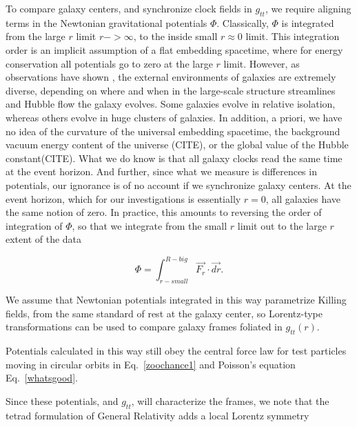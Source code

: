 \documentclass[reprint,%
 amsmath,amssymb,
 aps,
]{revtex4-1}
\begin{document}
 




 
   
  To compare galaxy centers, and  
 synchronize   clock fields   in $g_{tt}$, we   require aligning terms in  the Newtonian  gravitational potentials  $\Phi $. 
 Classically, $\Phi$ is integrated from the large $r$ limit   $r->\infty$,  to the inside small $r\approx 0$ limit. 
This integration order is an implicit assumption of a flat embedding spacetime, where for   energy conservation all potentials go to zero at the large $r$ limit. 
However,  as observations have shown \cite{Pomarede:2020pme,Hoffman:2017ako}, 
the external environments of galaxies are   extremely   diverse,   depending on where and when  in the large-scale structure streamlines and Hubble flow the galaxy evolves. Some galaxies evolve in relative isolation, whereas others evolve in   huge clusters of galaxies. In addition, a priori,  we have no idea of the curvature of the universal embedding spacetime,  the background vacuum energy content of the universe (CITE), or the  global   value of the Hubble constant(CITE).  What we do know  is that all galaxy clocks read the same time at the event horizon. And further, since
  what we measure    is differences in potentials, our ignorance is of no account if we synchronize galaxy centers. At the event horizon, which for our investigations is essentially $r=0$,  all 
  galaxies have  the same notion of zero. In practice,  this   amounts to reversing the 
    order of integration of $\Phi$, so that  we 
integrate  from the small $r$ limit out  to the large $r$  extent of the data  

 \begin{equation}
     \Phi  =   \int^{R-big}_{r-small} \vec{F_r}\cdot\vec{dr}  . 
      \label{eq:Newt2}
      \end{equation}
 
   We   assume that Newtonian potentials integrated in this way parametrize Killing fields,     from the same standard of rest at the galaxy center, so   Lorentz-type transformations can be used to compare galaxy frames foliated in $g_{tt}(r)$. 
   
     Potentials calculated in this way still obey the central force law for test particles moving in circular orbits in Eq.~\ref{zoochance1} and Poisson's equation Eq.~\ref{whatsgood}.

Since these potentials, and $g_{tt}$, will characterize the frames, we note that the tetrad formulation of General Relativity adds a local Lorentz symmetry
\end{document}
